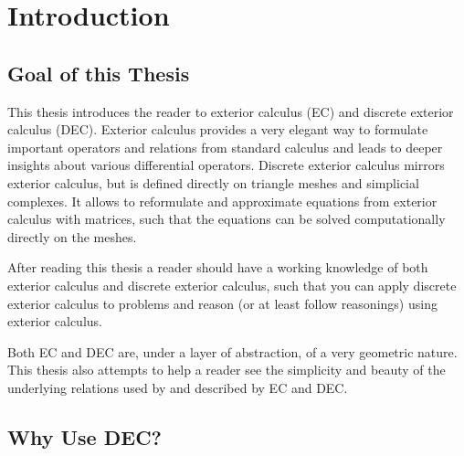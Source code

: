 \chapter{Introduction}
	
	\section{Goal of this Thesis}
	
	This thesis introduces the reader to exterior calculus (EC) and discrete exterior calculus (DEC). Exterior calculus provides a very elegant way to formulate important operators and relations from standard calculus and leads to deeper insights about various differential operators. Discrete exterior calculus mirrors exterior calculus, but is defined directly on triangle meshes and simplicial complexes. It allows to reformulate and approximate equations from exterior calculus with matrices, such that the equations can be solved computationally directly on the meshes. 
	
After reading this thesis a reader should have a working knowledge of both exterior calculus and discrete exterior calculus, such that you can apply discrete exterior calculus to problems and reason (or at least follow reasonings) using exterior calculus. 
	
Both EC and DEC are, under a layer of abstraction, of a very geometric nature. This thesis also attempts to help a reader see the simplicity and beauty of the underlying relations used by and described by EC and DEC.

\section{Why Use DEC?}

